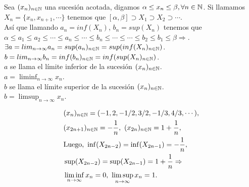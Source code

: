 \begin{definition}
  Sea \((x_n)_{n \in \mathbb{N}}\) una sucesión acotada, digamos \(\alpha \leq x_n \leq \beta, \forall n \in \mathbb{N}\).
  Si llamamos \(X_n = \{ x_n, x_{n+1}, \cdots \}\) tenemos que \([\alpha, \beta] \supset X_1 \supset X_2 \supset \cdots\). \\
  Así que llamando \(a_n = inf(X_n)\), \(b_n = sup(X_n)\) tenemos que \\
  \(\alpha \leq a_1 \leq a_2 \leq \cdots \leq a_n \leq \cdots \leq b_n \leq \cdots \leq \cdots \leq b_2 \leq b_1 \leq \beta \Rightarrow\). \\
  \(\exists a = lim_{n \to \infty} a_n = sup(a_n)_{n \in \mathbb{N}} = sup(inf(X_n)_{n \in \mathbb{N}})\). \\
  \(b = lim_{n \to \infty} b_n = inf(b_n)_{n \in \mathbb{N}} = inf(sup(X_n)_{n \in \mathbb{N}})\). \\

  \(a\) se llama el límite inferior de la sucesión \((x_n)_{n \in \mathbb{N}}\). \\
  \(a = \liminf_{n \to \infty} x_n\). \\

  \(b\) se llama el límite superior de la sucesión \((x_n)_{n \in \mathbb{N}}\). \\
  \(b = \limsup_{n \to \infty} x_n\).
\end{definition}

\clearpage

\begin{eg}
  \begin{align*}
     & (x_n)_{n \in \mathbb{N}} = (-1, 2, -1/2, 3/2, -1/3, 4/3, \cdots),                      \\
     & (x_{2n+1})_{n \in \mathbb{N}} = -\frac{1}{n}, \ (x_{2n})_{n \in \mathbb{N}} = 1 + \frac{1}{n}, \\
     & \text{Luego, } \inf(X_{2n-2}) = \inf(X_{2n-1}) = -\frac{1}{n},                 \\
     & \sup(X_{2n-2}) = \sup(X_{2n-1}) = 1 + \frac{1}{n} \Rightarrow                  \\
     & \liminf_{n \to \infty} x_n = 0, \ \limsup_{n \to \infty} x_n = 1.
  \end{align*}
\end{eg}